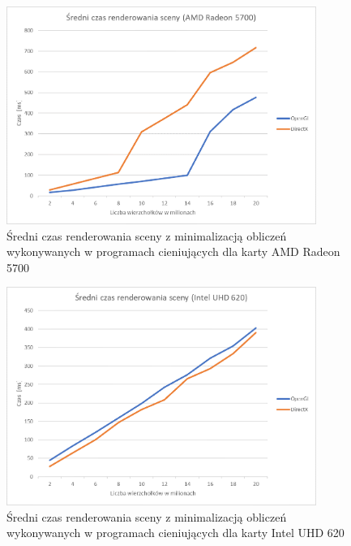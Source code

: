 \documentclass[archive]{mgr}
\begin{document}
\begin{figure}[h!]
  \centering
    \includegraphics[width=0.9\textwidth]{images/shaderoff/2.png}
   \caption{Średni czas renderowania sceny z minimalizacją obliczeń wykonywanych w programach cieniujących dla karty AMD Radeon 5700}
   \label{lab:32}
\end{figure}
\bigbreak
\begin{figure}[h!]
  \centering
    \includegraphics[width=0.9\textwidth]{images/shaderoff/3.png}
   \caption{Średni czas renderowania sceny z minimalizacją obliczeń wykonywanych w programach cieniujących dla karty Intel UHD 620}
   \label{lab:33}
\end{figure}
\newpage
\end{document}
